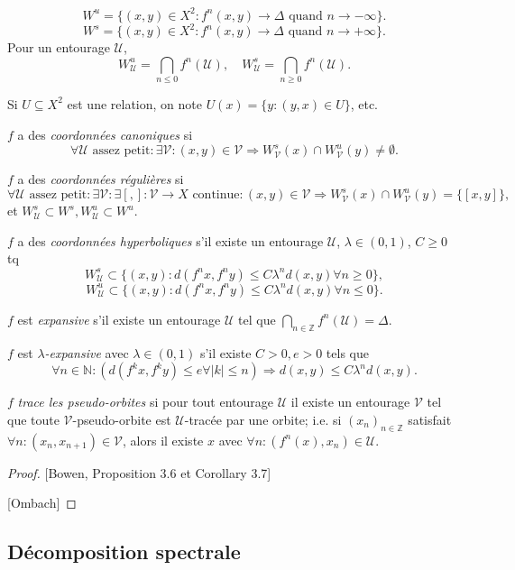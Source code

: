 \documentclass{amsart}
\begin{document}
\begin{defn}
  \[W^u=\{(x,y)\in X^2:f^n(x,y)\to\Delta\text{ quand }n\to-\infty\}.\]
  \[W^s=\{(x,y)\in X^2:f^n(x,y)\to\Delta\text{ quand }n\to+\infty\}.\]
  Pour un entourage $\mathcal U$,
  \[W_{\mathcal U}^u=\bigcap_{n\le0}f^n(\mathcal U),\quad
    W_{\mathcal U}^s=\bigcap_{n\ge0}f^n(\mathcal U).\]

  Si $U\subseteq X^2$ est une relation, on note $U(x)=\{y: (y,x)\in U\}$, etc.

  $f$ a des \emph{coordonn\'ees canoniques} si
  \[\forall\mathcal U\text{ assez petit}:\exists\mathcal V:(x,y)\in\mathcal V\Rightarrow W_{\mathcal V}^s(x)\cap W_{\mathcal V}^u(y)\ne\emptyset.\]

  $f$ a des \emph{coordonn\'ees r\'eguli\`eres} si
  \[\forall\mathcal U\text{ assez petit}:\exists\mathcal V:\exists[,]\colon\mathcal V\to X\text{ continue}:(x,y)\in\mathcal V\Rightarrow W_{\mathcal V}^s(x)\cap W_{\mathcal V}^u(y)=\{[x,y]\},\]
  et $W_{\mathcal U}^s\subset W^s,W_{\mathcal U}^u\subset W^u$.

  $f$ a des \emph{coordonn\'ees hyperboliques} s'il existe un entourage $\mathcal U$, $\lambda\in(0,1)$, $C\ge0$ tq
  \[W_{\mathcal U}^s\subset\{(x,y):d(f^n x,f^n y)\le C\lambda^n d(x,y)\forall n\ge0\},\]
  \[W_{\mathcal U}^u\subset\{(x,y):d(f^n x,f^n y)\le C\lambda^n d(x,y)\forall n\le0\}.\]

  $f$ est \emph{expansive} s'il existe un entourage $\mathcal U$ tel que $\bigcap_{n\in\mathbb Z}f^n(\mathcal U)=\Delta$.

  $f$ est \emph{$\lambda$-expansive} avec $\lambda\in(0,1)$ s'il existe $C>0,e>0$ tels que
  \[\forall n\in\mathbb N: (d(f^k x,f^k y)\le e\forall |k|\le n)\Rightarrow d(x,y)\le C\lambda^n d(x,y).\]

  $f$ \emph{trace les pseudo-orbites} si pour tout entourage $\mathcal U$ il existe un entourage $\mathcal V$ tel que toute $\mathcal V$-pseudo-orbite est $\mathcal U$-trac\'ee par une orbite; i.e. si $(x_n)_{n\in\mathbb Z}$ satisfait $\forall n:(x_n,x_{n+1})\in\mathcal V$, alors il existe $x$ avec $\forall n:(f^n(x),x_n)\in\mathcal U$.
\end{defn}
\begin{proof}

  [Bowen, Proposition 3.6 et Corollary 3.7]

  [Ombach]
\end{proof}

\subsection{D\'ecomposition spectrale}
\end{document}
